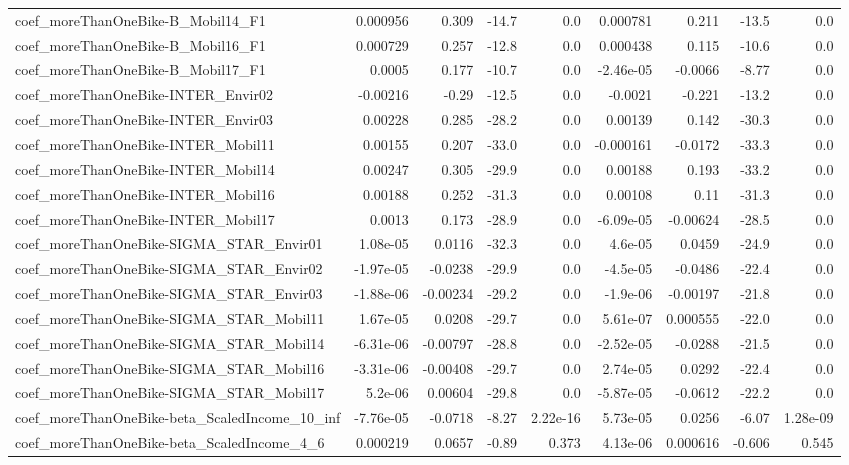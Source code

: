 \begin{tabular}{lrrrrrrrr}
coef_moreThanOneBike-B_Mobil14_F1 & 0.000956 & 0.309 & -14.7 & 0.0 & 0.000781 & 0.211 & -13.5 & 0.0 \\
coef_moreThanOneBike-B_Mobil16_F1 & 0.000729 & 0.257 & -12.8 & 0.0 & 0.000438 & 0.115 & -10.6 & 0.0 \\
coef_moreThanOneBike-B_Mobil17_F1 & 0.0005 & 0.177 & -10.7 & 0.0 & -2.46e-05 & -0.0066 & -8.77 & 0.0 \\
coef_moreThanOneBike-INTER_Envir02 & -0.00216 & -0.29 & -12.5 & 0.0 & -0.0021 & -0.221 & -13.2 & 0.0 \\
coef_moreThanOneBike-INTER_Envir03 & 0.00228 & 0.285 & -28.2 & 0.0 & 0.00139 & 0.142 & -30.3 & 0.0 \\
coef_moreThanOneBike-INTER_Mobil11 & 0.00155 & 0.207 & -33.0 & 0.0 & -0.000161 & -0.0172 & -33.3 & 0.0 \\
coef_moreThanOneBike-INTER_Mobil14 & 0.00247 & 0.305 & -29.9 & 0.0 & 0.00188 & 0.193 & -33.2 & 0.0 \\
coef_moreThanOneBike-INTER_Mobil16 & 0.00188 & 0.252 & -31.3 & 0.0 & 0.00108 & 0.11 & -31.3 & 0.0 \\
coef_moreThanOneBike-INTER_Mobil17 & 0.0013 & 0.173 & -28.9 & 0.0 & -6.09e-05 & -0.00624 & -28.5 & 0.0 \\
coef_moreThanOneBike-SIGMA_STAR_Envir01 & 1.08e-05 & 0.0116 & -32.3 & 0.0 & 4.6e-05 & 0.0459 & -24.9 & 0.0 \\
coef_moreThanOneBike-SIGMA_STAR_Envir02 & -1.97e-05 & -0.0238 & -29.9 & 0.0 & -4.5e-05 & -0.0486 & -22.4 & 0.0 \\
coef_moreThanOneBike-SIGMA_STAR_Envir03 & -1.88e-06 & -0.00234 & -29.2 & 0.0 & -1.9e-06 & -0.00197 & -21.8 & 0.0 \\
coef_moreThanOneBike-SIGMA_STAR_Mobil11 & 1.67e-05 & 0.0208 & -29.7 & 0.0 & 5.61e-07 & 0.000555 & -22.0 & 0.0 \\
coef_moreThanOneBike-SIGMA_STAR_Mobil14 & -6.31e-06 & -0.00797 & -28.8 & 0.0 & -2.52e-05 & -0.0288 & -21.5 & 0.0 \\
coef_moreThanOneBike-SIGMA_STAR_Mobil16 & -3.31e-06 & -0.00408 & -29.7 & 0.0 & 2.74e-05 & 0.0292 & -22.4 & 0.0 \\
coef_moreThanOneBike-SIGMA_STAR_Mobil17 & 5.2e-06 & 0.00604 & -29.8 & 0.0 & -5.87e-05 & -0.0612 & -22.2 & 0.0 \\
coef_moreThanOneBike-beta_ScaledIncome_10_inf & -7.76e-05 & -0.0718 & -8.27 & 2.22e-16 & 5.73e-05 & 0.0256 & -6.07 & 1.28e-09 \\
coef_moreThanOneBike-beta_ScaledIncome_4_6 & 0.000219 & 0.0657 & -0.89 & 0.373 & 4.13e-06 & 0.000616 & -0.606 & 0.545 \\

\end{tabular}
